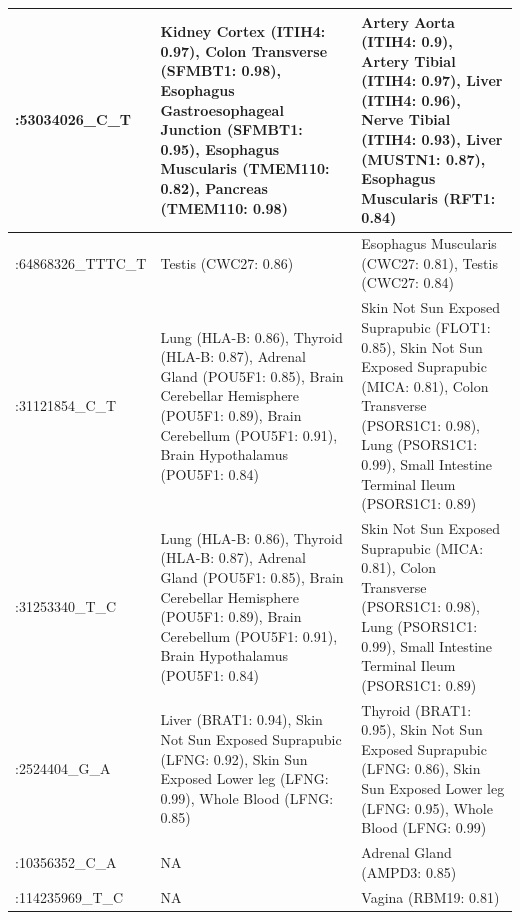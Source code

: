 \begin{longtable}[t]{l>{\raggedright\arraybackslash}p{10em}>{\raggedright\arraybackslash}p{10em}}
\endfoot
\bottomrule
\endlastfoot
\begingroup\fontsize{12}{14}\selectfont 3:53034026\_C\_T\endgroup & \begingroup\fontsize{12}{14}\selectfont Kidney Cortex (ITIH4: 0.97), Colon Transverse (SFMBT1: 0.98), Esophagus Gastroesophageal Junction (SFMBT1: 0.95), Esophagus Muscularis (TMEM110: 0.82), Pancreas (TMEM110: 0.98)\endgroup & \begingroup\fontsize{12}{14}\selectfont Artery Aorta (ITIH4: 0.9), Artery Tibial (ITIH4: 0.97), Liver (ITIH4: 0.96), Nerve Tibial (ITIH4: 0.93), Liver (MUSTN1: 0.87), Esophagus Muscularis (RFT1: 0.84)\endgroup\\
\midrule
\begingroup\fontsize{12}{14}\selectfont 5:64868326\_TTTC\_T\endgroup & \begingroup\fontsize{12}{14}\selectfont Testis (CWC27: 0.86)\endgroup & \begingroup\fontsize{12}{14}\selectfont Esophagus Muscularis (CWC27: 0.81), Testis (CWC27: 0.84)\endgroup\\
\midrule
\begingroup\fontsize{12}{14}\selectfont 6:31121854\_C\_T\endgroup & \begingroup\fontsize{12}{14}\selectfont Lung (HLA-B: 0.86), Thyroid (HLA-B: 0.87), Adrenal Gland (POU5F1: 0.85), Brain Cerebellar Hemisphere (POU5F1: 0.89), Brain Cerebellum (POU5F1: 0.91), Brain Hypothalamus (POU5F1: 0.84)\endgroup & \begingroup\fontsize{12}{14}\selectfont Skin Not Sun Exposed Suprapubic (FLOT1: 0.85), Skin Not Sun Exposed Suprapubic (MICA: 0.81), Colon Transverse (PSORS1C1: 0.98), Lung (PSORS1C1: 0.99), Small Intestine Terminal Ileum (PSORS1C1: 0.89)\endgroup\\
\midrule
\begingroup\fontsize{12}{14}\selectfont 6:31253340\_T\_C\endgroup & \begingroup\fontsize{12}{14}\selectfont Lung (HLA-B: 0.86), Thyroid (HLA-B: 0.87), Adrenal Gland (POU5F1: 0.85), Brain Cerebellar Hemisphere (POU5F1: 0.89), Brain Cerebellum (POU5F1: 0.91), Brain Hypothalamus (POU5F1: 0.84)\endgroup & \begingroup\fontsize{12}{14}\selectfont Skin Not Sun Exposed Suprapubic (MICA: 0.81), Colon Transverse (PSORS1C1: 0.98), Lung (PSORS1C1: 0.99), Small Intestine Terminal Ileum (PSORS1C1: 0.89)\endgroup\\
\midrule
\begingroup\fontsize{12}{14}\selectfont 7:2524404\_G\_A\endgroup & \begingroup\fontsize{12}{14}\selectfont Liver (BRAT1: 0.94), Skin Not Sun Exposed Suprapubic (LFNG: 0.92), Skin Sun Exposed Lower leg (LFNG: 0.99), Whole Blood (LFNG: 0.85)\endgroup & \begingroup\fontsize{12}{14}\selectfont Thyroid (BRAT1: 0.95), Skin Not Sun Exposed Suprapubic (LFNG: 0.86), Skin Sun Exposed Lower leg (LFNG: 0.95), Whole Blood (LFNG: 0.99)\endgroup\\
\midrule
\addlinespace
\begingroup\fontsize{12}{14}\selectfont 11:10356352\_C\_A\endgroup & \begingroup\fontsize{12}{14}\selectfont NA\endgroup & \begingroup\fontsize{12}{14}\selectfont Adrenal Gland (AMPD3: 0.85)\endgroup\\
\midrule
\begingroup\fontsize{12}{14}\selectfont 12:114235969\_T\_C\endgroup & \begingroup\fontsize{12}{14}\selectfont NA\endgroup & \begingroup\fontsize{12}{14}\selectfont Vagina (RBM19: 0.81)\endgroup\\*
\end{longtable}

